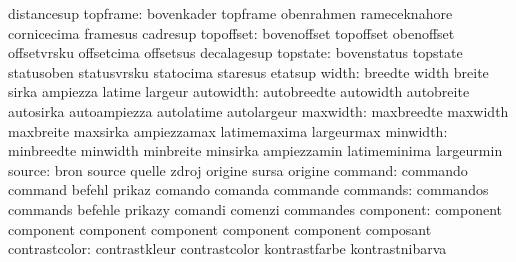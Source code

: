                            distancesup
                 topframe: bovenkader                topframe
                           obenrahmen                rameceknahore
                           cornicecima               framesus
                           cadresup
                topoffset: bovenoffset               topoffset
                           obenoffset                offsetvrsku
                           offsetcima                offsetsus
                           decalagesup
                 topstate: bovenstatus               topstate
                           statusoben                statusvrsku
                           statocima                 staresus
                           etatsup
                    width: breedte                   width
                           breite                    sirka
                           ampiezza                  latime
                           largeur
                autowidth: autobreedte               autowidth
                           autobreite                autosirka
                           autoampiezza              autolatime
                           autolargeur
                 maxwidth: maxbreedte                maxwidth
                           maxbreite                 maxsirka
                           ampiezzamax               latimemaxima
                           largeurmax
                 minwidth: minbreedte                minwidth
                           minbreite                 minsirka
                           ampiezzamin               latimeminima
                           largeurmin
                   source: bron                      source
                           quelle                    zdroj
                           origine                   sursa
                           origine
                  command: commando                  command
                           befehl                    prikaz
                           comando                   comanda
                           commande
                 commands: commandos                 commands
                           befehle                   prikazy
                           comandi                   comenzi
                           commandes
                component: component                 component
                           component                 component
                           component                 component
                           composant
            contrastcolor: contrastkleur             contrastcolor
                           kontrastfarbe             kontrastnibarva
